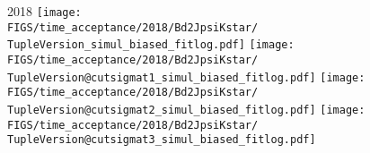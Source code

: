 \begin{frame}
  2018
  \texttt{[image: \\FIGS/time\_acceptance/2018/Bd2JpsiKstar/\\TupleVersion\_simul\_biased\_fitlog.pdf]}
  \texttt{[image: \\FIGS/time\_acceptance/2018/Bd2JpsiKstar/\\TupleVersion@cutsigmat1\_simul\_biased\_fitlog.pdf]}
  \texttt{[image: \\FIGS/time\_acceptance/2018/Bd2JpsiKstar/\\TupleVersion@cutsigmat2\_simul\_biased\_fitlog.pdf]}
  \texttt{[image: \\FIGS/time\_acceptance/2018/Bd2JpsiKstar/\\TupleVersion@cutsigmat3\_simul\_biased\_fitlog.pdf]}

\end{frame} %



